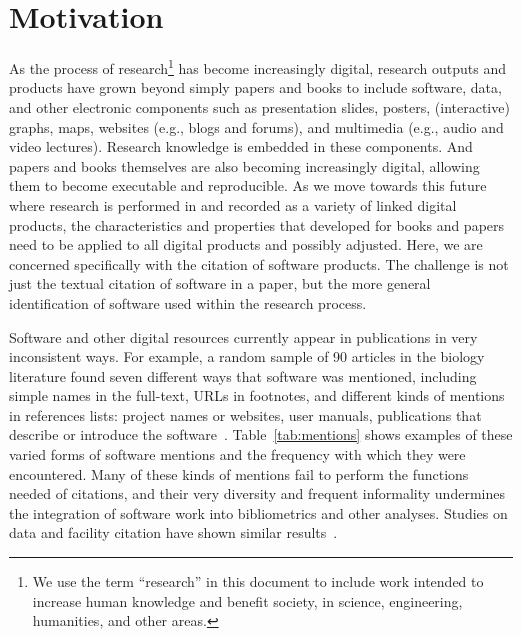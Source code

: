 \documentclass[12pt, oneside]{amsart}
\begin{document}
\section{Motivation}
\label{sec:intro}

As the process of research\footnote{We use the term ``research'' in this document to include work intended to increase human knowledge and benefit society, in science, engineering, humanities, and other areas.} has become increasingly digital, research outputs
and products have grown beyond simply papers and books to include software,
data, and other electronic components such as presentation slides, posters,
(interactive)  graphs, maps, websites (e.g., blogs and forums), and multimedia
(e.g., audio and  video lectures).  Research knowledge is embedded in these
components. And papers and books themselves are also becoming increasingly
digital, allowing them to become executable and reproducible. As we move towards
this future where research is performed in and recorded as a variety of linked
digital products, the characteristics and properties that developed for books
and papers need to be applied to all digital products and possibly adjusted.
Here, we are concerned specifically with the citation of software products. The
challenge is not just the textual citation of software in a paper, but the more
general identification of software used within the research process.

Software and other digital resources currently appear in publications in very
inconsistent ways. For example, a random sample of 90 articles in the biology
literature found seven different ways that software was mentioned, including
simple names in the full-text, URLs in footnotes, and different kinds of
mentions in references lists: project names or websites, user manuals,
publications that describe or introduce the software~\cite{howison2015jasist}.
Table~\ref{tab:mentions} shows examples of these varied forms of software
mentions and the frequency with which they were encountered.
Many of these kinds of mentions fail to perform the functions needed of
citations, and their very diversity and frequent informality undermines the
integration of software work into bibliometrics and other analyses.
Studies on data and facility citation have shown similar
results~\cite{10.1371/journal.pone.0136631, mayernik_poster,
parsons_duerr_minster}.
\end{document}
